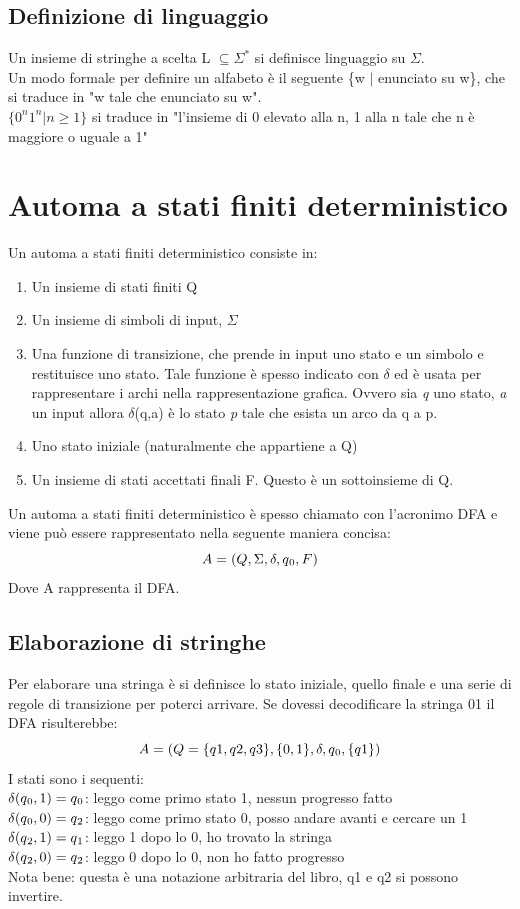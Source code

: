 \documentclass[12pt]{article}
\begin{document}
\subsection{Definizione di linguaggio}
Un insieme di stringhe a scelta L $\subseteq\Sigma^*$ si definisce linguaggio su $\Sigma$. 
\\ Un modo formale per definire un alfabeto è il seguente \{w $|$ enunciato su w\}, che si traduce in "w tale che enunciato su w".
\\ $\{0^n 1^n | n \ge 1 \}$ si traduce in "l’insieme di 0 elevato alla n, 1 alla n tale che n è maggiore o uguale a 1" 

\newpage
\section{Automa a stati finiti deterministico}
Un automa a stati finiti deterministico consiste in: 
\begin{enumerate}
  \item Un insieme di stati finiti Q
  \item Un insieme di simboli di input, $\Sigma$
  \item Una funzione di transizione, che prende in input uno stato e un simbolo e restituisce uno stato. Tale funzione è spesso indicato con $\delta$ ed è usata per rappresentare i archi nella rappresentazione grafica. Ovvero sia \emph{q} uno stato, \emph{a} un input allora $\delta$(q,a) è lo stato \emph{p} tale che esista un arco da q a p.
  \item Uno stato iniziale (naturalmente che appartiene a Q)
  \item Un insieme di stati accettati finali F. Questo è un sottoinsieme di Q.
\end{enumerate}
Un automa a stati finiti deterministico è spesso chiamato con l'acronimo DFA e viene può essere rappresentato nella seguente maniera concisa: 
\[A = (Q, \Sigma, \delta, q\textsubscript{0}, F)\]
Dove A rappresenta il DFA.

\subsection{ Elaborazione di stringhe }
Per elaborare una stringa è si definisce lo stato iniziale, quello finale e una serie di regole di transizione per poterci arrivare. 
Se dovessi decodificare la stringa 01 il DFA risulterebbe: 
\[A = (Q=\{q1,q2,q3\}, \{0,1\}, \delta, q\textsubscript{0}, \{q1\})\]
I stati sono i sequenti: 
\\ $\delta(q\textsubscript{0},1)=q\textsubscript{0}$: leggo come primo stato 1, nessun progresso fatto
\\ $\delta(q\textsubscript{0},0)=q\textsubscript{2}$: leggo come primo stato 0, posso andare avanti e cercare un 1
\\ $\delta(q\textsubscript{2},1)=q\textsubscript{1}$: leggo 1 dopo lo 0, ho trovato la stringa
\\ $\delta(q\textsubscript{2},0)=q\textsubscript{2}$: leggo 0 dopo lo 0, non ho fatto progresso
\\ Nota bene: questa è una notazione arbitraria del libro, q1 e q2 si possono invertire.
\end{document}
